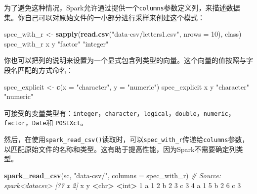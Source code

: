 \documentclass[
]{article}
\newenvironment{Shaded}{\begin{snugshade}}{\end{snugshade}}
\newcommand{\CommentTok}[1]{\textcolor[rgb]{0.56,0.35,0.01}{\textit{#1}}}
\newcommand{\DataTypeTok}[1]{\textcolor[rgb]{0.13,0.29,0.53}{#1}}
\newcommand{\DecValTok}[1]{\textcolor[rgb]{0.00,0.00,0.81}{#1}}
\newcommand{\ErrorTok}[1]{\textcolor[rgb]{0.64,0.00,0.00}{\textbf{#1}}}
\newcommand{\KeywordTok}[1]{\textcolor[rgb]{0.13,0.29,0.53}{\textbf{#1}}}
\newcommand{\NormalTok}[1]{#1}
\newcommand{\OperatorTok}[1]{\textcolor[rgb]{0.81,0.36,0.00}{\textbf{#1}}}
\newcommand{\StringTok}[1]{\textcolor[rgb]{0.31,0.60,0.02}{#1}}
\begin{document}
为了避免这种情况，Spark允许通过提供一个\texttt{columns}参数定义列，来描述数据集。你自己可以对原始文件的一小部分进行采样来创建这个模式：

\begin{Shaded}
\begin{Highlighting}[]
\NormalTok{spec_with_r <-}\StringTok{ }\KeywordTok{sapply}\NormalTok{(}\KeywordTok{read.csv}\NormalTok{(}\StringTok{"data-csv/letters1.csv"}\NormalTok{, }\DataTypeTok{nrows =} \DecValTok{10}\NormalTok{), class)}
\NormalTok{spec_with_r}
\NormalTok{ x y}
 \StringTok{"factor"} \StringTok{"integer"}
\end{Highlighting}
\end{Shaded}

你也可以把列的说明来设置为一个显式包含列类型的向量。这个向量的值按照与字段名匹配的方式命名：

\begin{Shaded}
\begin{Highlighting}[]
\NormalTok{spec_explicit <-}\StringTok{ }\KeywordTok{c}\NormalTok{(}\DataTypeTok{x =} \StringTok{"character"}\NormalTok{, }\DataTypeTok{y =} \StringTok{"numeric"}\NormalTok{)}
\NormalTok{spec_explicit}
\NormalTok{ x y}
\StringTok{"character"} \StringTok{"numeric"}
\end{Highlighting}
\end{Shaded}

可接受的变量类型有：\texttt{integer}，\texttt{character}，\texttt{logical}，\texttt{double}，\texttt{numeric}，\texttt{factor}，\texttt{Date}和
\texttt{POSIXct}。

然后，在使用\texttt{spark\_read\_csv()}读取时，可以\texttt{spec\_with\_r}传递给\texttt{columns}参数，以匹配原始文件的名称和类型。这有助于提高性能，因为Spark不需要确定列类型。

\begin{Shaded}
\begin{Highlighting}[]
\KeywordTok{spark_read_csv}\NormalTok{(sc, }\StringTok{"data-csv/"}\NormalTok{, }\DataTypeTok{columns =}\NormalTok{ spec_with_r)}
\CommentTok{# Source: spark<datacsv> [?? x 2]}
\NormalTok{ x y}
 \OperatorTok{<}\NormalTok{chr}\OperatorTok{>}\StringTok{ }\ErrorTok{<}\NormalTok{int}\OperatorTok{>}
\DecValTok{1}\NormalTok{ a }\DecValTok{1}
\DecValTok{2}\NormalTok{ b }\DecValTok{2}
\DecValTok{3}\NormalTok{ c }\DecValTok{3}
\DecValTok{4}\NormalTok{ a }\DecValTok{1}
\DecValTok{5}\NormalTok{ b }\DecValTok{2}
\DecValTok{6}\NormalTok{ c }\DecValTok{3}
\end{Highlighting}
\end{Shaded}
\end{document}
